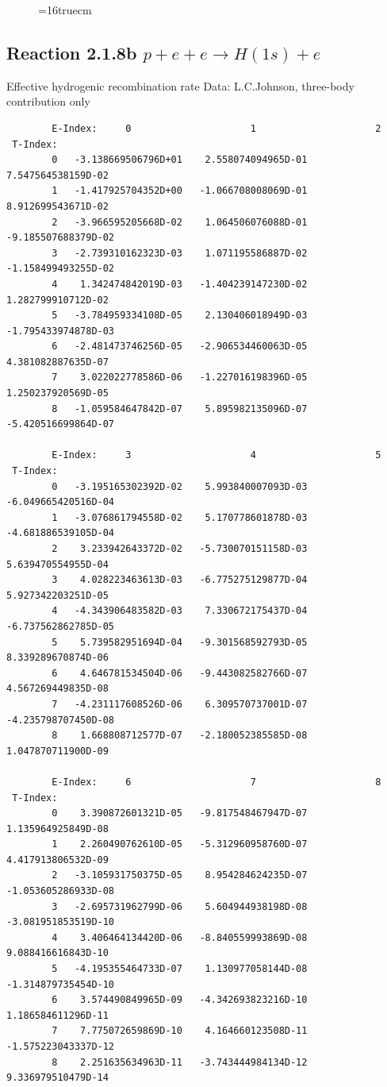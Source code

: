 \documentclass[12pt,dvips]{article}
\begin{document}
\begin{figure} \label{2.1.8a}
\epsfxsize=16truecm
\end{figure}
\newpage

\subsection{
  Reaction 2.1.8b  $p + e + e \rightarrow H(1s) + e$
}

   Effective hydrogenic recombination rate
   Data: L.C.Johnson, three-body contribution only



\begin{small}\begin{verbatim}
        E-Index:     0                     1                     2
 T-Index:
        0   -3.138669506796D+01    2.558074094965D-01    7.547564538159D-02
        1   -1.417925704352D+00   -1.066708008069D-01    8.912699543671D-02
        2   -3.966595205668D-02    1.064506076088D-01   -9.185507688379D-02
        3   -2.739310162323D-03    1.071195586887D-02   -1.158499493255D-02
        4    1.342474842019D-03   -1.404239147230D-02    1.282799910712D-02
        5   -3.784959334108D-05    2.130406018949D-03   -1.795433974878D-03
        6   -2.481473746256D-05   -2.906534460063D-05    4.381082887635D-07
        7    3.022022778586D-06   -1.227016198396D-05    1.250237920569D-05
        8   -1.059584647842D-07    5.895982135096D-07   -5.420516699864D-07

        E-Index:     3                     4                     5
 T-Index:
        0   -3.195165302392D-02    5.993840007093D-03   -6.049665420516D-04
        1   -3.076861794558D-02    5.170778601878D-03   -4.681886539105D-04
        2    3.233942643372D-02   -5.730070151158D-03    5.639470554955D-04
        3    4.028223463613D-03   -6.775275129877D-04    5.927342203251D-05
        4   -4.343906483582D-03    7.330672175437D-04   -6.737562862785D-05
        5    5.739582951694D-04   -9.301568592793D-05    8.339289670874D-06
        6    4.646781534504D-06   -9.443082582766D-07    4.567269449835D-08
        7   -4.231117608526D-06    6.309570737001D-07   -4.235798707450D-08
        8    1.668808712577D-07   -2.180052385585D-08    1.047870711900D-09

        E-Index:     6                     7                     8
 T-Index:
        0    3.390872601321D-05   -9.817548467947D-07    1.135964925849D-08
        1    2.260490762610D-05   -5.312960958760D-07    4.417913806532D-09
        2   -3.105931750375D-05    8.954284624235D-07   -1.053605286933D-08
        3   -2.695731962799D-06    5.604944938198D-08   -3.081951853519D-10
        4    3.406464134420D-06   -8.840559993869D-08    9.088416616843D-10
        5   -4.195355464733D-07    1.130977058144D-08   -1.314879735454D-10
        6    3.574490849965D-09   -4.342693823216D-10    1.186584611296D-11
        7    7.775072659869D-10    4.164660123508D-11   -1.575223043337D-12
        8    2.251635634963D-11   -3.743444984134D-12    9.336979510479D-14


\end{verbatim}
\end{small}
\end{document}
